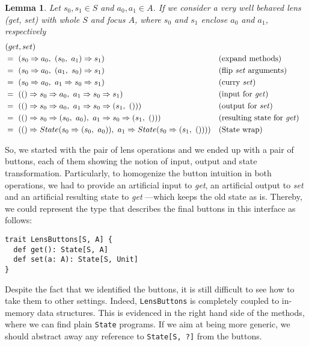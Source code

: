 \documentclass[preview, 3p]{elsarticle}
\newtheorem{lemma}[theorem]{Lemma}
\begin{document}
\begin{lemma}
  Let $s_0, s_1 \in S$ and $a_0, a_1 \in A$. If we consider a very well behaved
  lens (\emph{get}, \emph{set}) with whole $S$ and focus $A$, where $s_0$ and
  $s_1$ enclose $a_0$ and $a_1$, respectively
  \begin{align*}
    &  (get, set) \\
    &=\ (s_0 \Rightarrow a_0,\ (s_0,\ a_1) \Rightarrow s_1) &&\text{(expand methods)} \\
    &=\ (s_0 \Rightarrow a_0,\ (a_1,\ s_0) \Rightarrow s_1) &&\text{(flip \emph{set} arguments)} \\
    &=\ (s_0 \Rightarrow a_0,\ a_1 \Rightarrow s_0 \Rightarrow s_1) &&\text{(curry \emph{set})} \\
    &=\ (() \Rightarrow s_0 \Rightarrow a_0,\ a_1 \Rightarrow s_0 \Rightarrow s_1) &&\text{(input for \emph{get})} \\
    &=\ (() \Rightarrow s_0 \Rightarrow a_0,\ a_1 \Rightarrow s_0 \Rightarrow (s_1,\ ())) &&\text{(output for \emph{set})} \\
    &=\ (() \Rightarrow s_0 \Rightarrow (s_0,\ a_0),\ a_1 \Rightarrow s_0 \Rightarrow (s_1,\ ())) &&\text{(resulting state for \emph{get})} \\
    &=\ (() \Rightarrow State(s_0 \Rightarrow (s_0,\ a_0)),\ a_1 \Rightarrow State(s_0 \Rightarrow (s_1,\ ()))) &&\text{(State wrap)} \\
  \end{align*}
\end{lemma}

So, we started with the pair of lens operations and we ended up with a pair of
buttons, each of them showing the notion of input, output and state
transformation. Particularly, to homogenize the button intuition in both
operations, we had to provide an artificial input to \emph{get}, an artificial
output to \emph{set} and an artificial resulting state to \emph{get} ---which
keeps the old state as is. Thereby, we could represent the type that describes
the final buttons in this interface as follows:
\begin{lstlisting}
trait LensButtons[S, A] {
  def get(): State[S, A]
  def set(a: A): State[S, Unit]
}
\end{lstlisting}

Despite the fact that we identified the buttons, it is still difficult to see
how to take them to other settings. Indeed, \lstinline{LensButtons} is
completely coupled to in-memory data structures. This is evidenced in the right
hand side of the methods, where we can find plain \lstinline{State} programs. If
we aim at being more generic, we should abstract away any reference to
\lstinline{State[S, ?]} from the buttons.
\end{document}
